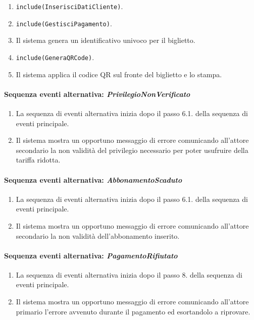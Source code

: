 \documentclass{article}
\begin{document}
\begin{enumerate}[itemsep=6pt,parsep=0pt]
		\item  \texttt{{include(InserisciDatiCliente)}}.

		\item  \texttt{{include(GestisciPagamento)}}.

		\item Il sistema genera un identificativo univoco per il biglietto.

		\item  \texttt{{include(GeneraQRCode)}}.

		\item Il sistema applica il codice QR sul fronte del biglietto e lo stampa.
	\end{enumerate}
	
	\paragraph{Sequenza eventi alternativa: \emph{PrivilegioNonVerificato}}
		\begin{enumerate}[itemsep=8pt,parsep=0pt]
				\item La sequenza di eventi alternativa inizia dopo il passo 6.1. della sequenza di eventi principale.
				\item Il sistema mostra un opportuno messaggio di errore comunicando all'attore secondario la non validità del privilegio necessario per poter usufruire della tariffa ridotta.
		\end{enumerate}

	\paragraph{Sequenza eventi alternativa: \emph{AbbonamentoScaduto}}
		\begin{enumerate}[itemsep=8pt,parsep=0pt]
				\item La sequenza di eventi alternativa inizia dopo il passo 6.1. della sequenza di eventi principale.
				\item Il sistema mostra un opportuno messaggio di errore comunicando all'attore secondario la non validità dell'abbonamento inserito.
		\end{enumerate}

	\paragraph{Sequenza eventi alternativa: \emph{PagamentoRifiutato}}
		\begin{enumerate}[itemsep=8pt,parsep=0pt]
				\item La sequenza di eventi alternativa inizia dopo il passo 8. della sequenza di eventi principale.
				\item Il sistema mostra un opportuno messaggio di errore comunicando all'attore primario l'errore avvenuto durante il pagamento ed esortandolo a riprovare.
		\end{enumerate}
\end{document}
